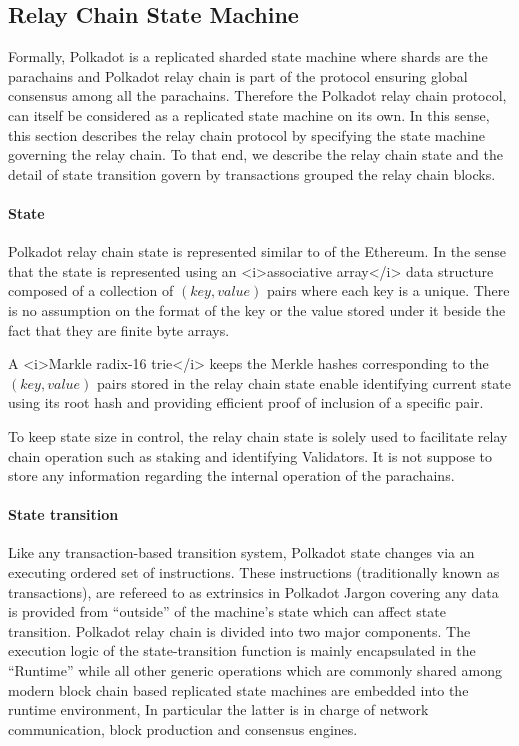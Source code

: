 \subsection{Relay Chain State Machine}\label{sec:relaychain}

Formally, Polkadot is a replicated sharded state machine where shards are the parachains and Polkadot relay chain is part of the protocol ensuring global consensus among all the parachains. Therefore the Polkadot relay chain protocol, can itself be considered as a replicated state machine on its own. In this sense, this section describes the relay chain protocol by specifying the state machine governing the relay chain. To that end, we describe the relay chain state and the detail of state transition govern by transactions grouped the relay chain blocks.

\paragraph{State}
Polkadot relay chain state is represented similar to of the Ethereum. In the sense that the state is represented using an <i>associative array</i> data structure composed of a collection of $(key, value)$ pairs where each key is a unique. There is no assumption on the format of the key or the value stored under it beside the fact that they are finite byte arrays.

A <i>Markle radix-16 trie</i> keeps the Merkle hashes corresponding to the $(key, value)$ pairs stored in the relay chain state enable identifying current state using its root hash and providing efficient proof of inclusion of a specific pair.

To keep state size in control, the relay chain state is solely used to facilitate relay chain operation such as staking and identifying Validators. It is not suppose to store any information regarding the internal operation of the parachains.

\paragraph{State transition}
Like any transaction-based transition system, Polkadot state changes via an executing ordered set of instructions. These instructions (traditionally known as transactions), are refereed to as extrinsics in Polkadot Jargon covering any data is provided from ``outside'' of the machine's state which can affect state transition. Polkadot relay chain is divided into two major components. The execution logic of the state-transition function is mainly encapsulated in the ``Runtime'' while all other generic operations which are commonly shared among modern block chain based replicated state machines are embedded into the runtime environment, In particular the latter is in charge of network communication, block production and consensus engines.


